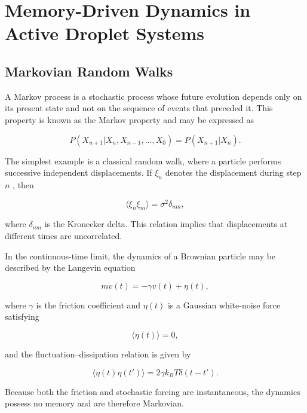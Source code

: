 \chapter{Memory-Driven Dynamics in Active Droplet Systems}
\section{Markovian Random Walks}
A Markov process is a stochastic process whose future evolution depends only on its present state\cite{balakrishnan2021,resnick1992} and not on the sequence of events that preceded it. This property is known as the Markov property and may be expressed as\cite{resnick1992}

\begin{equation}
P(X_{n+1}|X_n,X_{n-1},\ldots,X_0)
=
P(X_{n+1}|X_n).
\end{equation}

The simplest example is a classical random walk, where a particle performs successive independent displacements. If $\xi_n$ denotes the displacement during step $n$ \cite{klafter2011,resnick1992}, then

\begin{equation}
\langle \xi_n \xi_m \rangle
=
\sigma^2 \delta_{nm},
\end{equation}

where $\delta_{nm}$ is the Kronecker delta. This relation implies that displacements at different times are uncorrelated.

In the continuous-time limit, the dynamics of a Brownian particle may be described by the Langevin equation\cite{balakrishnan2021}

\begin{equation}
m\dot{v}(t)
=
-\gamma v(t)
+
\eta(t),
\end{equation}

where $\gamma$ is the friction coefficient and $\eta(t)$ is a Gaussian white-noise force satisfying

\begin{equation}
\langle \eta(t) \rangle = 0,
\end{equation}

and the fluctuation--dissipation relation is given by \cite{klafter2011,balakrishnan2021}

\begin{equation}
\langle \eta(t)\eta(t') \rangle
=
2\gamma k_B T \delta(t-t').
\end{equation}

Because both the friction and stochastic forcing are instantaneous, the dynamics possess no memory and are therefore Markovian.

